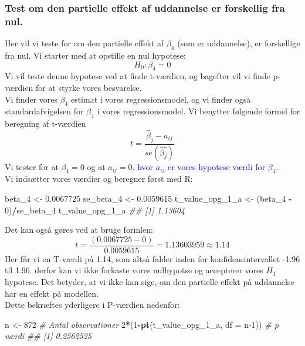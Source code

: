 \documentclass[
  10pt,
]{article}
\newenvironment{Shaded}{\begin{snugshade}}{\end{snugshade}}
\newcommand{\CommentTok}[1]{\textcolor[rgb]{0.56,0.35,0.01}{\textit{#1}}}
\newcommand{\DataTypeTok}[1]{\textcolor[rgb]{0.13,0.29,0.53}{#1}}
\newcommand{\DecValTok}[1]{\textcolor[rgb]{0.00,0.00,0.81}{#1}}
\newcommand{\FloatTok}[1]{\textcolor[rgb]{0.00,0.00,0.81}{#1}}
\newcommand{\KeywordTok}[1]{\textcolor[rgb]{0.13,0.29,0.53}{\textbf{#1}}}
\newcommand{\NormalTok}[1]{#1}
\newcommand{\OperatorTok}[1]{\textcolor[rgb]{0.81,0.36,0.00}{\textbf{#1}}}
\newcommand{\StringTok}[1]{\textcolor[rgb]{0.31,0.60,0.02}{#1}}
\begin{document}
\hypertarget{test-om-den-partielle-effekt-af-uddannelse-er-forskellig-fra-nul.}{%
\subsubsection{Test om den partielle effekt af uddannelse er forskellig
fra
nul.}\label{test-om-den-partielle-effekt-af-uddannelse-er-forskellig-fra-nul.}}

Her vil vi teste for om den partielle effekt af \(\beta_4\) (som er
uddannelse), er forskellige fra nul. Vi starter med at opstille en nul
hypotese: \[H_0:\beta_4=0 \] Vi vil teste denne hypotese ved at finde
t-værdien, og bagefter vil vi finde p-værdien for at styrke vores
besvarelse.\\
Vi finder vores \(\beta_4\) estimat i vores regressionsmodel, og vi
finder også standardafvigelsen for \(\beta_4\) i vores regressionsmodel.
Vi benytter følgende formel for beregning af t-værdien
\[ t=\frac{\hat{\beta}_j-a_{ij}} {se(\hat{\beta_j})}\] Vi tester for at
\(\beta_4 = 0\) og at \(a_{ij}= 0\).
\textcolor{blue}{hvor $a_{ij}$ er vores hypotese værdi for $\beta_4$.}\\
Vi indsætter vores værdier og beregner først med R:

\begin{Shaded}
\begin{Highlighting}[]
\NormalTok{beta_}\DecValTok{4}\NormalTok{ <-}\StringTok{ }\FloatTok{0.0067725}
\NormalTok{se_beta_}\DecValTok{4}\NormalTok{ <-}\StringTok{ }\FloatTok{0.0059615}
\NormalTok{t_value_opg_}\DecValTok{1}\NormalTok{_a <-}\StringTok{ }\NormalTok{(beta_}\DecValTok{4} \OperatorTok{-}\StringTok{ }\DecValTok{0}\NormalTok{)}\OperatorTok{/}\NormalTok{se_beta_}\DecValTok{4}
\NormalTok{t_value_opg_}\DecValTok{1}\NormalTok{_a}
\CommentTok{## [1] 1.13604}
\end{Highlighting}
\end{Shaded}

Det kan også gøres ved at bruge formlen:
\[ t=\frac{(0.0067725-0)}{0.0059615}=1.13603959≈1.14\] Her får vi en
T-værdi på 1.14, som altså falder inden for konfidensintervallet -1.96
til 1.96. derfor kan vi ikke forkaste vores nulhypotse og accepterer
vores \(H_1\) hypotese. Det betyder, at vi ikke kan sige, om den
partielle effekt på uddannelse har en effekt på modellen.\\
Dette bekræftes yderligere i P-værdien nedenfor:

\begin{Shaded}
\begin{Highlighting}[]
\NormalTok{n <-}\StringTok{ }\DecValTok{872} \CommentTok{# Antal observationer}
\DecValTok{2}\OperatorTok{*}\NormalTok{(}\DecValTok{1}\OperatorTok{-}\KeywordTok{pt}\NormalTok{(t_value_opg_}\DecValTok{1}\NormalTok{_a, }\DataTypeTok{df =}\NormalTok{ n}\DecValTok{-1}\NormalTok{)) }\CommentTok{# p værdi}
\CommentTok{## [1] 0.2562525}
\end{Highlighting}
\end{Shaded}
\end{document}
